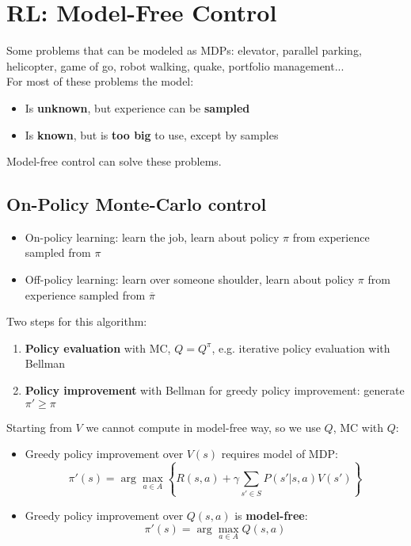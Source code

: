 
\section{RL: Model-Free Control}
    Some problems that can be modeled as MDPs: elevator, parallel parking, helicopter, game of go, robot walking, quake, portfolio management...\\
    For most of these problems the model:
    \begin{itemize}
        \item Is \textbf{unknown}, but experience can be \textbf{sampled}
        \item Is \textbf{known}, but is \textbf{too big} to use, except by samples
    \end{itemize}
    Model-free control can solve these problems.

\subsection{On-Policy Monte-Carlo control}
    \begin{itemize}
        \item On-policy learning: learn the job, learn about policy $\pi$ from experience sampled from $\pi$
        \item Off-policy learning: learn over someone shoulder, learn about policy $\pi$ from experience sampled from $\overline{\pi}$
    \end{itemize}
    Two steps for this algorithm:
    \begin{enumerate}
        \item \textbf{Policy evaluation} with MC, $Q=Q^\pi$, e.g. iterative policy evaluation with Bellman
        \item \textbf{Policy improvement} with Bellman for greedy policy improvement: generate $\pi' \geq \pi$
    \end{enumerate}
    Starting from $V$ we cannot compute in model-free way, so we use $Q$, MC with $Q$:
    \begin{itemize}
        \item Greedy policy improvement over $V(s)$ requires model of MDP:
        $$\pi'(s)=\arg\max_{a\in A}\left\{R(s,a)+\gamma\sum_{s'\in S}P(s'|s,a)V(s')\right\}$$
        \item Greedy policy improvement over $Q(s,a)$ is \textbf{model-free}:
        $$\pi'(s)=\arg\max_{a\in A}Q(s,a)$$
    \end{itemize}
